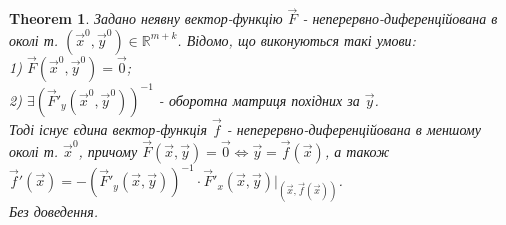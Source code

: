 \documentclass[a4paper, 10pt]{article}
\theoremstyle{theoremdd}
\newtheorem{theorem}{Theorem}[subsection]
\theoremstyle{theoremdd}
\theoremstyle{theoremdd}
\theoremstyle{theoremdd}
\theoremstyle{theoremdd}
\theoremstyle{theoremdd}
\theoremstyle{theoremdd}
\theoremstyle{theoremdd}
\theoremstyle{theoremdd}
\begin{document}
\begin{theorem}
Задано неявну вектор-функцію $\vec{F}$ - неперервно-диференційована в околі т. $(\vec{x}^0, \vec{y}^0) \in \mathbb{R}^{m+k}$. Відомо, що виконуються такі умови:\\
1) $\vec{F}(\vec{x}^0,\vec{y}^0) = \vec{0}$;\\
2) $\exists \left(\vec{F}'_y(\vec{x}^0,\vec{y}^0)\right)^{-1}$ - оборотна матриця похідних за $\vec{y}$.\\
Тоді існує єдина вектор-функція $\vec{f}$ - неперервно-диференційована в меншому околі т. $\vec{x}^0$, причому $\vec{F}(\vec{x},\vec{y}) = \vec{0} \iff \vec{y} = \vec{f}(\vec{x})$, а також $\vec{f}'(\vec{x}) = -(\vec{F}'_y(\vec{x},\vec{y}))^{-1} \cdot \vec{F}'_x (\vec{x},\vec{y}) \Big|_{(\vec{x}, \vec{f}(\vec{x}))}$.\\
\textit{Без доведення.}
\end{theorem}
\end{document}
